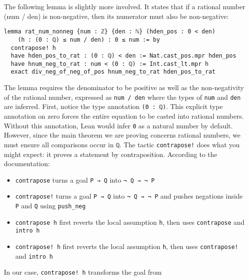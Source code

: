 \begin{example}
  The following lemma is slightly more involved.
  It states that if a rational number (num / den)
  is non-negative, then its numerator must also be non-negative:
  \begin{lstlisting}[language=lean]
lemma rat_num_nonneg {num : ℤ} {den : ℕ} (hden_pos : 0 < den)
    (h : (0 : ℚ) ≤ num / den) : 0 ≤ num := by
  contrapose! h
  have hden_pos_to_rat : (0 : ℚ) < den := Nat.cast_pos.mpr hden_pos
  have hnum_neg_to_rat : num < (0 : ℚ) := Int.cast_lt.mpr h
  exact div_neg_of_neg_of_pos hnum_neg_to_rat hden_pos_to_rat
\end{lstlisting}
  The lemma requires the denominator to be positive as well as the non-negativity of the rational number,
  expressed as \lstinline[language=lean]|num / den| where the types of
  \lstinline[language=lean]|num| and \lstinline[language=lean]|den| are inferred.
  First, notice the type annotation \lstinline[language=lean]|(0 : ℚ)|.
  This explicit type annotation on zero forces the entire equation to be casted
  into rational numbers.
  Without this annotation, Lean would infer \lstinline[language=lean]|0|
  as a natural number by default. However, since the main theorem we are proving concerns rational numbers,
  we must ensure all comparisons occur in \lstinline[language=lean]|ℚ|.
  The tactic \lstinline[language=lean]|contrapose!| does what you might expect: it proves a statement by contraposition. According to the documentation:
  \begin{itemize}
    \item \lstinline[language=lean]|contrapose| turns a goal \lstinline[language=lean]|P → Q| into \lstinline[language=lean]|¬ Q → ¬ P|
    \item \lstinline[language=lean]|contrapose!| turns a goal \lstinline[language=lean]|P → Q| into \lstinline[language=lean]|¬ Q → ¬ P| and pushes negations inside \lstinline[language=lean]|P| and \lstinline[language=lean]|Q| using \lstinline[language=lean]|push_neg|
    \item \lstinline[language=lean]|contrapose h| first reverts the local assumption \lstinline[language=lean]|h|, then uses \lstinline[language=lean]|contrapose| and \lstinline[language=lean]|intro h|
    \item \lstinline[language=lean]|contrapose! h| first reverts the local assumption \lstinline[language=lean]|h|, then uses \lstinline[language=lean]|contrapose!| and \lstinline[language=lean]|intro h|
  \end{itemize}
  In our case, \lstinline[language=lean]|contrapose! h| transforms the goal from

\end{example}
